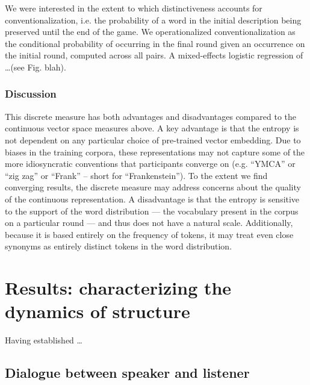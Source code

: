 We were interested in the extent to which distinctiveness accounts for conventionalization, i.e. the probability of a word in the initial description being preserved until the end of the game. 
We operationalized conventionalization as the conditional probability of occurring in the final round given an occurrence on the initial round, computed across all pairs. 
A mixed-effects logistic regression of \dots (see Fig. blah).

\subsubsection{Discussion}

This discrete measure has both advantages and disadvantages compared to the continuous vector space measures above.
A key advantage is that the entropy is not dependent on any particular choice of pre-trained vector embedding. 
Due to biases in the training corpora, these representations may not capture some of the more idiosyncratic conventions that participants converge on (e.g. ``YMCA'' or ``zig zag'' or ``Frank'' -- short for ``Frankenstein'').
To the extent we find converging results, the discrete measure may address concerns about the quality of the continuous representation.
A disadvantage is that the entropy is sensitive to the support of the word distribution --- the vocabulary present in the corpus on a particular round --- and thus does not have a natural scale.
Additionally, because it is based entirely on the frequency of tokens, it may treat even close synonyms as entirely distinct tokens in the word distribution. 

\section{Results: characterizing the dynamics of structure}\label{results}

Having established \dots

\subsection{Dialogue between speaker and listener}\label{listener-feedback}

